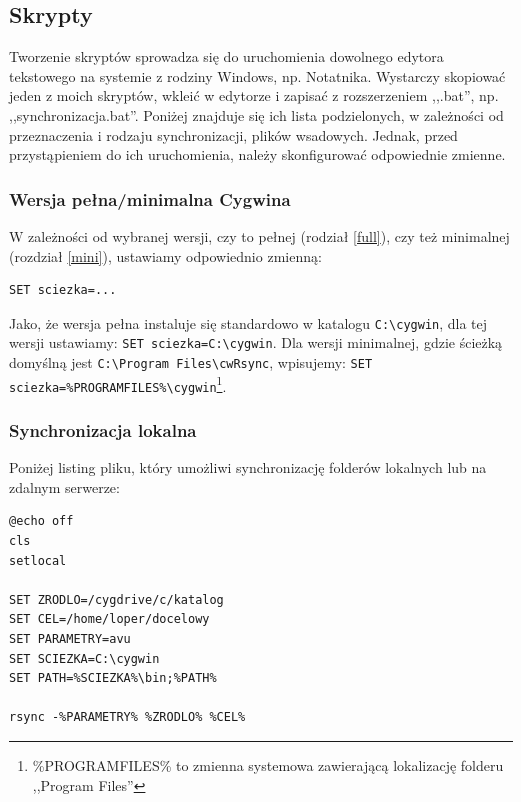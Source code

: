 \subsection{Skrypty}
\label{skrypty}
Tworzenie skryptów sprowadza się do uruchomienia dowolnego edytora tekstowego na systemie z rodziny Windows, np. Notatnika. Wystarczy skopiować jeden z moich skryptów, wkleić w edytorze i zapisać z rozszerzeniem ,,.bat'', np. ,,synchronizacja.bat''. Poniżej znajduje się ich lista podzielonych, w zależności od przeznaczenia i rodzaju synchronizacji, plików wsadowych. Jednak, przed przystąpieniem do ich uruchomienia, należy skonfigurować odpowiednie zmienne.
\subsubsection{Wersja pełna/minimalna Cygwina}
\label{pelmin}
W zależności od wybranej wersji, czy to pełnej (rodział \ref{full}), czy też minimalnej (rozdział \ref{mini}), ustawiamy odpowiednio zmienną:
\begin{verbatim}
SET sciezka=...
\end{verbatim}
Jako, że wersja pełna instaluje się standardowo w katalogu \verb|C:\cygwin|, dla tej wersji ustawiamy: \verb|SET sciezka=C:\cygwin|. Dla wersji minimalnej, gdzie ścieżką domyślną jest \verb|C:\Program Files\cwRsync|, wpisujemy: \verb|SET sciezka=%PROGRAMFILES%\cygwin|\footnote{\%PROGRAMFILES\% to zmienna systemowa zawierającą lokalizację folderu ,,Program Files''}.

\subsubsection{Synchronizacja lokalna}
Poniżej listing pliku, który umożliwi synchronizację folderów lokalnych lub na zdalnym serwerze:
\begin{verbatim}
@echo off
cls
setlocal

SET ZRODLO=/cygdrive/c/katalog
SET CEL=/home/loper/docelowy
SET PARAMETRY=avu
SET SCIEZKA=C:\cygwin
SET PATH=%SCIEZKA%\bin;%PATH%

rsync -%PARAMETRY% %ZRODLO% %CEL%
\end{verbatim}

